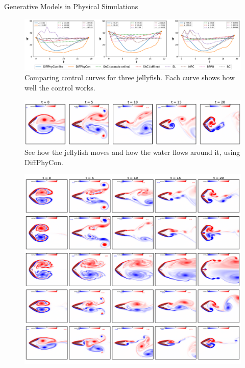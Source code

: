 \begin{frame}[allowframebreaks]{Generative Models in Physical Simulations}
    \framebreak
    \begin{figure}
        \centering
        \includegraphics[height=0.8\textheight,width=1.05\textwidth,keepaspectratio]{images/science/generative-models-gen-control.png}
        \caption*{Comparing control curves for three jellyfish. Each curve shows how well the control works.}
    \end{figure}

    \framebreak
    \begin{figure}
        \centering
        \includegraphics[height=0.8\textheight,width=1.05\textwidth,keepaspectratio]{images/science/generative-models-jellyfish.png}
        \caption*{See how the jellyfish moves and how the water flows around it, using DiffPhyCon.}
    \end{figure}

    \framebreak
    \begin{figure}
        \centering
        \includegraphics[height=0.9\textheight,width=1.05\textwidth,keepaspectratio]{images/science/generative-models-jellyfish-2.png}
    \end{figure}


\end{frame}
